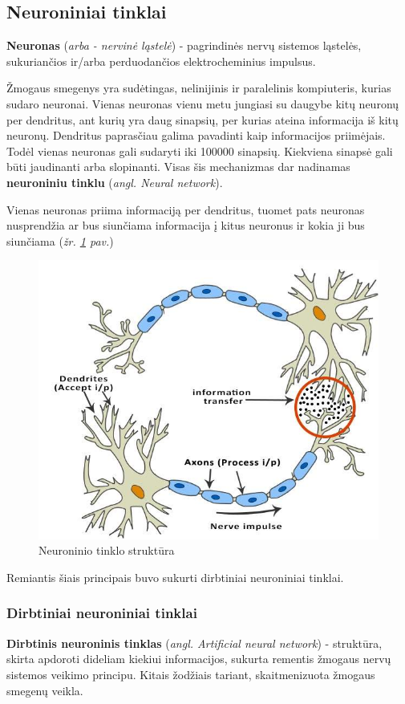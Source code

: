 \documentclass{VUMIFInfKursinis}
\begin{document}
\subsection{Neuroniniai tinklai}
\textbf{Neuronas} (\textit{arba - nervinė ląstelė}) - pagrindinės nervų sistemos ląstelės, sukuriančios ir/arba perduodančios elektrocheminius impulsus.


Žmogaus smegenys yra sudėtingas, nelinijinis ir paralelinis kompiuteris\cite{Hay09}, kurias sudaro neuronai. Vienas neuronas vienu metu jungiasi su daugybe kitų neuronų per dendritus, ant kurių yra daug sinapsių, per kurias ateina informacija iš kitų neuronų. Dendritus paprasčiau galima pavadinti kaip informacijos priimėjais. Todėl vienas neuronas gali sudaryti iki 100000 sinapsių. Kiekviena sinapsė gali būti jaudinanti arba slopinanti. Visas šis mechanizmas dar nadinamas \textbf{neuroniniu tinklu} (\textit{angl. Neural network}).

Vienas neuronas priima informaciją per dendritus, tuomet pats neuronas nusprendžia ar bus siunčiama informacija į kitus neuronus ir kokia ji bus siunčiama (\textit{žr. \ref{img:neuron_structure} pav.})

\begin{figure}[H]
	\centering
	\includegraphics[width=.5\linewidth]{img/neuron-structure}
	\caption[]{Neuroninio tinklo struktūra\footnotemark}
	\label{img:neuron_structure}
\end{figure}

Remiantis šiais principais buvo sukurti dirbtiniai neuroniniai tinklai.


\subsubsection{Dirbtiniai neuroniniai tinklai}
\textbf{Dirbtinis neuroninis tinklas} (\textit{angl. Artificial neural network}) - struktūra, skirta apdoroti dideliam kiekiui informacijos, sukurta rementis žmogaus nervų sistemos veikimo principu. Kitais žodžiais tariant, skaitmenizuota žmogaus smegenų veikla.
\end{document}

